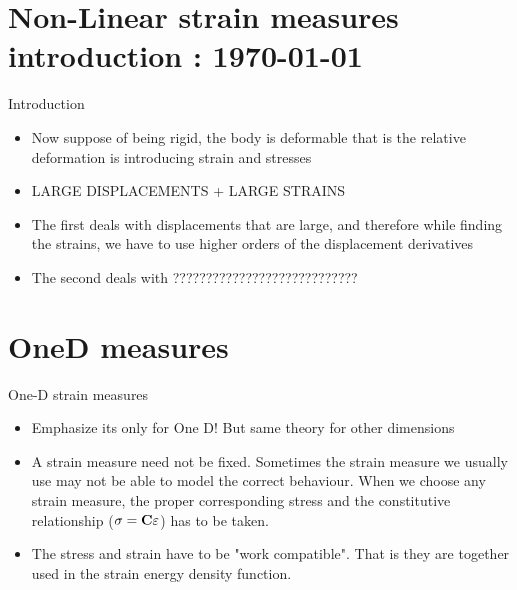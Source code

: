 




	\tableofcontents
	\section{Non-Linear strain measures introduction : \today}

	\begin{frame}{Introduction}
		\begin{itemize}
			\item Now suppose of being rigid, the body is deformable that is the relative deformation is introducing strain and stresses
			\item LARGE DISPLACEMENTS + LARGE STRAINS
			\item The first deals with displacements that are large, and therefore while finding the strains, we have to use higher orders of the displacement derivatives
			\item The second deals with ????????????????????????????		
		\end{itemize}
	\end{frame}

\section{OneD measures}
	\begin{frame}{One-D strain measures}
		\begin{itemize}
			\item Emphasize its only for One D! But same theory for other dimensions
			\item A strain measure need not be fixed. Sometimes the strain measure we usually use may not be able to model the correct behaviour. When we choose any strain measure, the proper corresponding stress and the  constitutive relationship ($\mathbf{\sigma = C \varepsilon}$) has to be taken. 
			\item The stress and strain have to be "work compatible". That is they are together used in the strain energy density function. 			
		\end{itemize}
	\end{frame}


